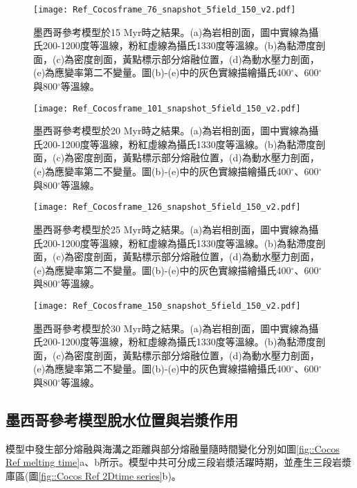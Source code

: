 \begin{figure*}[htp]
    \centering
    \texttt{[image: Ref\_Cocosframe\_76\_snapshot\_5field\_150\_v2.pdf]}
    \caption[墨西哥參考模型於15 Myr時之結果]{墨西哥參考模型於15 Myr時之結果。(a)為岩相剖面，圖中實線為攝氏200-1200度等溫線，粉紅虛線為攝氏1330度等溫線。(b)為黏滯度剖面，(c)為密度剖面，黃點標示部分熔融位置，(d)為動水壓力剖面，(e)為應變率第二不變量。圖(b)-(e)中的灰色實線描繪攝氏400$^{\circ}$、600$^{\circ}$與800$^{\circ}$等溫線。}
    \label{fig::Ref Cocos 76}
\end{figure*}

\begin{figure*}[htp]
    \centering
    \texttt{[image: Ref\_Cocosframe\_101\_snapshot\_5field\_150\_v2.pdf]}
    \caption[墨西哥參考模型於20 Myr時之結果]{墨西哥參考模型於20 Myr時之結果。(a)為岩相剖面，圖中實線為攝氏200-1200度等溫線，粉紅虛線為攝氏1330度等溫線。(b)為黏滯度剖面，(c)為密度剖面，黃點標示部分熔融位置，(d)為動水壓力剖面，(e)為應變率第二不變量。圖(b)-(e)中的灰色實線描繪攝氏400$^{\circ}$、600$^{\circ}$與800$^{\circ}$等溫線。}
    \label{fig::Ref Cocos 101}
\end{figure*}

\begin{figure*}[htp]
    \centering
    \texttt{[image: Ref\_Cocosframe\_126\_snapshot\_5field\_150\_v2.pdf]}
    \caption[墨西哥參考模型於25 Myr時之結果]{墨西哥參考模型於25 Myr時之結果。(a)為岩相剖面，圖中實線為攝氏200-1200度等溫線，粉紅虛線為攝氏1330度等溫線。(b)為黏滯度剖面，(c)為密度剖面，黃點標示部分熔融位置，(d)為動水壓力剖面，(e)為應變率第二不變量。圖(b)-(e)中的灰色實線描繪攝氏400$^{\circ}$、600$^{\circ}$與800$^{\circ}$等溫線。}
    \label{fig::Ref Cocos 126}
\end{figure*}

\begin{figure*}[htp]
    \centering
    \texttt{[image: Ref\_Cocosframe\_150\_snapshot\_5field\_150\_v2.pdf]}
    \caption[墨西哥參考模型於30 Myr時之結果]{墨西哥參考模型於30 Myr時之結果。(a)為岩相剖面，圖中實線為攝氏200-1200度等溫線，粉紅虛線為攝氏1330度等溫線。(b)為黏滯度剖面，(c)為密度剖面，黃點標示部分熔融位置，(d)為動水壓力剖面，(e)為應變率第二不變量。圖(b)-(e)中的灰色實線描繪攝氏400$^{\circ}$、600$^{\circ}$與800$^{\circ}$等溫線。}
    \label{fig::Ref Cocos 150}
\end{figure*}

\newpage
\subsection{墨西哥參考模型脫水位置與岩漿作用}\label{墨西哥參考模型脫水位置與岩漿作用}
模型中發生部分熔融與海溝之距離與部分熔融量隨時間變化分別如圖\ref{fig::Cocos Ref melting time}a、b所示。模型中共可分成三段岩漿活躍時期，並產生三段岩漿庫區(圖\ref{fig::Cocos Ref 2Dtime series}b)。

